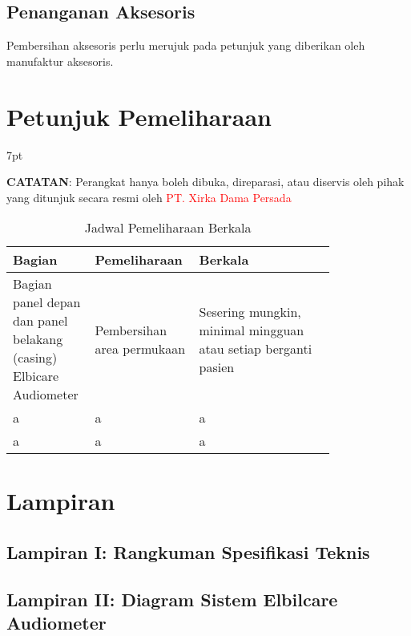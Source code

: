 \documentclass[11pt,a4paper,twoside,draft,onecolumn]{book}
\newenvironment{formalblue}{%
	\def\FrameCommand{%
		\hspace{1pt}%
		{\color{blue}\vrule width 2pt}%
		{\color{formalshade}\vrule width 4pt}%
		\colorbox{formalshade}%
	}%
	\MakeFramed{\advance\hsize-\width\FrameRestore}%
	\noindent\hspace{-4.55pt}%
	\begin{adjustwidth}{}{7pt}%
		\vspace{2pt}\vspace{2pt}%
	}
	{%
		\vspace{2pt}\end{adjustwidth}\endMakeFramed%
}
\begin{document}
		\section{Penanganan Aksesoris}
		Pembersihan aksesoris perlu merujuk pada petunjuk yang diberikan oleh manufaktur aksesoris.
	\newpage
	
	\chapter{Petunjuk Pemeliharaan}
	\begin{formalblue}
		 \textbf{CATATAN}:
		Perangkat hanya boleh dibuka, direparasi, atau diservis oleh pihak yang ditunjuk secara resmi oleh \textcolor{red}{PT. Xirka Dama Persada} 
	\end{formalblue}

	\begin{table}
		\centering
		\caption{Jadwal Pemeliharaan Berkala}
		\label{tab:7.2}
		\begin{tabular}{|p{0.2\linewidth}  | p{0.2\linewidth}| p{0.4\linewidth}|}
			\hline
			Bagian & Pemeliharaan & Berkala\\
			\hline
			\hline
			Bagian panel depan dan panel belakang (casing) Elbicare Audiometer & Pembersihan area permukaan & Sesering mungkin, minimal mingguan atau setiap berganti pasien\\
			\hline
			a & a & a\\
			\hline
			a & a & a\\
			\hline

		\end{tabular}
	\end{table}

	\newpage
	
	\chapter{Lampiran}
		\section{Lampiran I: Rangkuman Spesifikasi Teknis}
		\section{Lampiran II: Diagram Sistem Elbilcare Audiometer}
	\newpage
	
	
	
\end{document}
